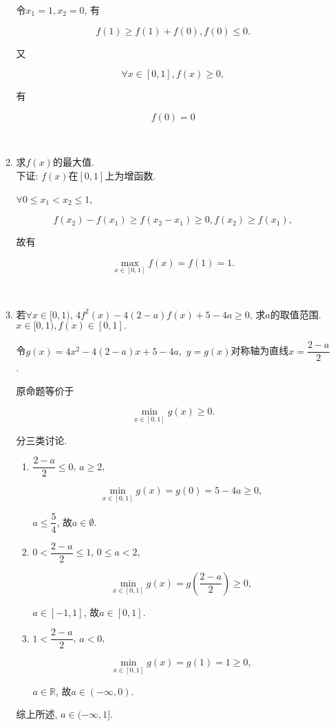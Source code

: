 \documentclass[8pt]{article}
\begin{document}
\begin{enumerate}[label=\arabic*.]
\begin{enumerate}[label=(\arabic*)]
					令$x_1 = 1, x_2 = 0$, 有

					$$f(1) \geq f(1) + f(0), f(0) \leq 0.$$

					又

					$$\forall x\in[0, 1], f(x) \geq 0,$$

					有

					$$f(0)=0$$

				~\\

				\item 求$f(x)$的最大值.
					~\\

					下证: $f(x)$在$[0, 1]$上为增函数.

					$\forall 0\leq x_1 < x_2 \leq 1$,

					$$f(x_2) - f(x_1) \geq f(x_2 - x_1) \geq 0, f(x_2) \geq f(x_1),$$

					故有

					$$\max_{x\in[0, 1]} f(x) = f(1) = 1.$$

				~\\

				\item 若$\forall x\in[0, 1)$, $4f^2(x) - 4(2-a) f(x) + 5-4a \geq 0$, 求$a$的取值范围.
					~\\

					$x\in [0, 1), f(x) \in [0, 1].$

					令$g(x) = 4x^2 - 4(2-a)x + 5-4a,$ $y=g(x)$对称轴为直线$x=\dfrac{2-a}{2}$.

					原命题等价于

					$$\min_{x\in[0, 1]} g(x) \geq 0.$$

					分三类讨论.

					\begin{enumerate}[label=$\arabic*^{\circ}$]
						\item $\dfrac{2-a}{2} \leq 0$, $a \geq 2$, 

							$$\min_{x\in[0, 1]} g(x) = g(0) = 5-4a \geq 0,$$

							$a\leq \dfrac{5}{4}$, 故$a\in \emptyset$.

						\item $0 < \dfrac{2-a}{2} \leq 1$, $0 \leq a < 2$,

							$$\min_{x\in[0, 1]} g(x) = g\left(\frac{2-a}{2}\right) \geq 0,$$

							$a\in[-1, 1]$, 故$a\in [0, 1]$.

						\item $1 < \dfrac{2-a}{2}$, $a<0$,

							$$\min_{x\in[0, 1]} g(x) = g(1) = 1 \geq 0,$$

							$a \in \mathbb{R}$, 故$a \in (-\infty, 0)$.

					\end{enumerate}

					综上所述, $a\in (-\infty, 1]$.

			\end{enumerate}

	\end{enumerate}
\end{document}
